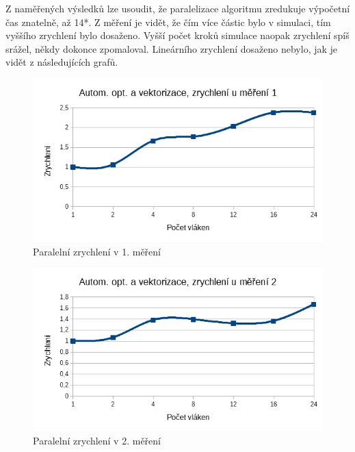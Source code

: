 \documentclass[12pt]{article}
\begin{document}
Z naměřených výsledků lze usoudit, že paralelizace algoritmu zredukuje výpočetní čas znatelně, až 14*.
Z měření je vidět, že čím více částic bylo v simulaci, tím vyššího zrychlení bylo dosaženo.
Vyšší počet kroků simulace naopak zrychlení spíš srážel, někdy dokonce zpomaloval.
Lineárního zrychlení dosaženo nebylo, jak je vidět z následujících grafů.

\begin{figure}[H]
  \begin{center}
     \includegraphics[width=12cm]{images/auto1acc.png}
    \caption{Paralelní zrychlení v 1. měření} 
  \end{center}
\end{figure}

\begin{figure}[H]
  \begin{center}
     \includegraphics[width=12cm]{images/auto2acc.png}
    \caption{Paralelní zrychlení v 2. měření} 
  \end{center}
\end{figure}
\end{document}
